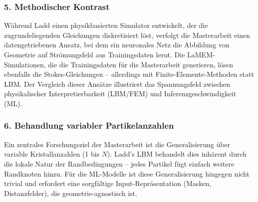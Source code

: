 \documentclass[a4paper,12pt]{article}
\begin{document}
\subsubsection*{5. Methodischer Kontrast}

W\"ahrend Ladd einen physikbasierten Simulator entwickelt, der die zugrundeliegenden Gleichungen diskretisiert l\"ost, verfolgt die Masterarbeit einen datengetriebenen Ansatz, bei dem ein neuronales Netz die Abbildung von Geometrie auf Str\"omungsfeld aus Trainingsdaten lernt. Die LaMEM-Simulationen, die die Trainingsdaten f\"ur die Masterarbeit generieren, l\"osen ebenfalls die Stokes-Gleichungen -- allerdings mit Finite-Elemente-Methoden statt LBM. Der Vergleich dieser Ans\"atze illustriert das Spannungsfeld zwischen physikalischer Interpretierbarkeit (LBM/FEM) und Inferenzgeschwindigkeit (ML).

\subsubsection*{6. Behandlung variabler Partikelanzahlen}

Ein zentrales Forschungsziel der Masterarbeit ist die Generalisierung \"uber variable Kristallanzahlen (1 bis $N$). Ladd's LBM behandelt dies inh\"arent durch die lokale Natur der Randbedingungen -- jedes Partikel f\"ugt einfach weitere Randknoten hinzu. F\"ur die ML-Modelle ist diese Generalisierung hingegen nicht trivial und erfordert eine sorgf\"altige Input-Repr\"asentation (Masken, Distanzfelder), die geometrie-agnostisch ist.
\end{document}
